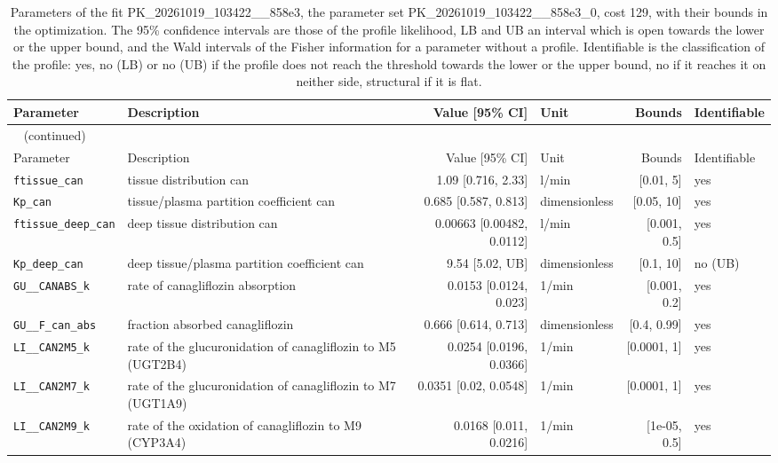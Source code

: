 \begin{longtable}{llrlrl}
\caption{Parameters of the fit PK\_20261019\_103422\_\_858e3, the parameter set PK\_20261019\_103422\_\_858e3\_0, cost 129, with their bounds in the optimization. The 95\% confidence intervals are those of the profile likelihood, LB and UB an interval which is open towards the lower or the upper bound, and the Wald intervals of the Fisher information for a parameter without a profile. Identifiable is the classification of the profile: yes, no (LB) or no (UB) if the profile does not reach the threshold towards the lower or the upper bound, no if it reaches it on neither side, structural if it is flat.}\label{tab:parameters:PK_20261019_103422__858e3} \\
\toprule
Parameter & Description & Value [95\% CI] & Unit & Bounds & Identifiable \\
\midrule
\endfirsthead
\multicolumn{6}{l}{\small\tablename~\thetable{} (continued)} \\
\toprule
Parameter & Description & Value [95\% CI] & Unit & Bounds & Identifiable \\
\midrule
\endhead
\bottomrule
\endlastfoot
\texttt{ftissue\_can} & tissue distribution can & 1.09 [0.716, 2.33] & l/min & [0.01, 5] & yes \\
\texttt{Kp\_can} & tissue/plasma partition coefficient can & 0.685 [0.587, 0.813] & dimensionless & [0.05, 10] & yes \\
\texttt{ftissue\_deep\_can} & deep tissue distribution can & 0.00663 [0.00482, 0.0112] & l/min & [0.001, 0.5] & yes \\
\texttt{Kp\_deep\_can} & deep tissue/plasma partition coefficient can & 9.54 [5.02, UB] & dimensionless & [0.1, 10] & no (UB) \\
\texttt{GU\_\_CANABS\_k} & rate of canagliflozin absorption & 0.0153 [0.0124, 0.023] & 1/min & [0.001, 0.2] & yes \\
\texttt{GU\_\_F\_can\_abs} & fraction absorbed canagliflozin & 0.666 [0.614, 0.713] & dimensionless & [0.4, 0.99] & yes \\
\texttt{LI\_\_CAN2M5\_k} & rate of the glucuronidation of canagliflozin to M5 (UGT2B4) & 0.0254 [0.0196, 0.0366] & 1/min & [0.0001, 1] & yes \\
\texttt{LI\_\_CAN2M7\_k} & rate of the glucuronidation of canagliflozin to M7 (UGT1A9) & 0.0351 [0.02, 0.0548] & 1/min & [0.0001, 1] & yes \\
\texttt{LI\_\_CAN2M9\_k} & rate of the oxidation of canagliflozin to M9 (CYP3A4) & 0.0168 [0.011, 0.0216] & 1/min & [1e-05, 0.5] & yes \\

\end{longtable}
